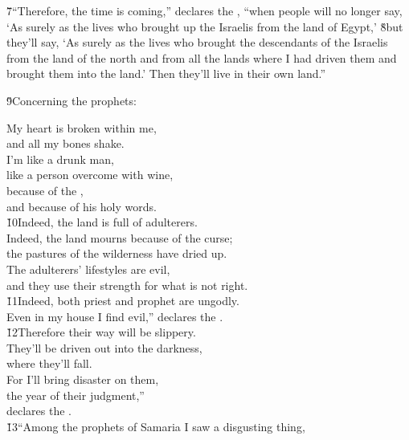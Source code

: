 \v{7}``Therefore, the time is coming,'' declares the , ``when people will no longer say, `As surely as the  lives who brought up the Israelis from the land of Egypt,' \v{8}but they'll say, `As surely as the  lives who brought the descendants of the Israelis from the land of the north and from all the lands where I had driven them and brought them into the land.' Then they'll live in their own land.''

\v{9}Concerning the prophets:

\begin{poetry}
\poeml My heart is broken within me, \\
\poemll    and all my bones shake. \\
\poeml I'm like a drunk man, \\
\poemll    like a person overcome with wine, \\
\poeml because of the , \\
\poemll    and because of his holy words. \\
\poeml \v{10}Indeed, the land is full of adulterers. \\
\poemll    Indeed, the land mourns because of the curse; \\
\poemlll       the pastures of the wilderness have dried up. \\
\poeml The adulterers' lifestyles are evil, \\
\poemll    and they use their strength for what is not right. \\
\poeml \v{11}Indeed, both priest and prophet are ungodly. \\
\poemll    Even in my house I find evil,'' declares the . \\
\poeml \v{12}Therefore their way will be slippery. \\
\poemll    They'll be driven out into the darkness, \\
\poemlll       where they'll fall. \\
\poeml For I'll bring disaster on them, \\
\poemll    the year of their judgment,'' \\
\poemlll       declares the . \\
\poeml \v{13}``Among the prophets of Samaria I saw a disgusting thing, \\

\end{poetry}
